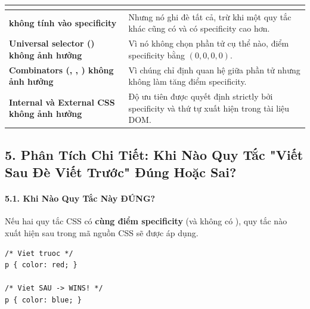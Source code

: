 \begin{prettyTableBox}
\sffamily\small
\begin{tabularx}{\linewidth}{|>{\bfseries\color{primaryBlue}}m{5.5cm}|Z|}
\hline
{}  &  \\
\hline
{} không tính vào specificity & Nhưng nó ghi đè tất cả, trừ khi một quy tắc khác cũng có  và có specificity cao hơn. \\
\hline
Universal selector (\codeinline{*}) không ảnh hưởng & Vì nó không chọn phần tử cụ thể nào, điểm specificity bằng $(0,0,0,0)$. \\
\hline
Combinators (\codeinline{>}, \codeinline{+}, \codeinline{\~{}}) không ảnh hưởng & Vì chúng chỉ định quan hệ giữa phần tử nhưng không làm tăng điểm specificity. \\
\hline
Internal và External CSS không ảnh hưởng & Độ ưu tiên được quyết định strictly bởi specificity và thứ tự xuất hiện trong tài liệu DOM. \\
\hline
\end{tabularx}
\end{prettyTableBox}

\subsection{5. Phân Tích Chi Tiết: Khi Nào Quy Tắc "Viết Sau Đè Viết Trước" Đúng Hoặc Sai?}

\paragraph{5.1. Khi Nào Quy Tắc Này ĐÚNG?}
\begin{conceptBox}
Nếu hai quy tắc CSS có \textbf{cùng điểm specificity} (và không có ), quy tắc nào xuất hiện sau trong mã nguồn CSS sẽ được áp dụng.
\end{conceptBox}

\begin{codeWindow}
\begin{lstlisting}[language=CSS3]
/* Viet truoc */
p { color: red; }

/* Viet SAU -> WINS! */
p { color: blue; }
\end{lstlisting}
\end{codeWindow}

